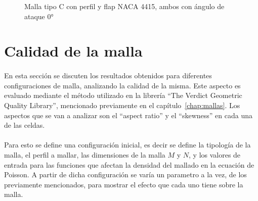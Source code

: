 \documentclass[letterpaper, openright, 12pt]{book}
\begin{document}
    \begin{figure}[htbp!]
        \centering
        \caption[Malla tipo C con perfily flap NACA 4415]{Malla tipo C con perfil
             y flap NACA 4415, ambos con ángulo de ataque 0\si{\degree}}
        \label{fig:naca4415_c_flap}
    \end{figure}


    \section{Calidad de la malla}
    \paragraph*{}
    En esta sección se discuten los resultados obtenidos para diferentes
    configuraciones de malla, analizando la calidad de la misma. Este
    aspecto es evaluado mediante el método utilizado en la librería ``The
    Verdict Geometric Quality Library'', mencionado previamente en el
    capítulo~\ref{chap:mallas}. Los aspectos que se van a analizar son el
    ``aspect ratio'' y el ``skewness'' en cada una de las celdas.

    \paragraph*{}
    Para esto se define una configuración inicial, es decir se define la
    tipología de la malla, el perfil a mallar, las dimensiones de la malla
    $M$ y $N$, y los valores de entrada para las funciones que afectan la
    densidad del mallado en la ecuación de Poisson. A partir de dicha
    configuración se varía un parametro a la vez, de los previamente
    mencionados, para mostrar el efecto que cada uno tiene sobre la malla.
\end{document}
